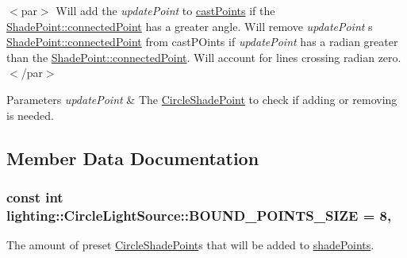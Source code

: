$<$par$>$ Will add the {\itshape update\+Point}  to \hyperlink{classlighting_1_1CircleLightSource_ab25c86954fad0715d502d1f60649ede4}{cast\+Points} if the \hyperlink{classlighting_1_1ShadePoint_a0840495febcd385a90e89e003aa15972}{Shade\+Point\+::connected\+Point} has a greater angle. Will remove {\itshape update\+Point} \textquotesingle{}s \hyperlink{classlighting_1_1ShadePoint_a0840495febcd385a90e89e003aa15972}{Shade\+Point\+::connected\+Point} from cast\+P\+Oints if {\itshape update\+Point}  has a radian greater than the \hyperlink{classlighting_1_1ShadePoint_a0840495febcd385a90e89e003aa15972}{Shade\+Point\+::connected\+Point}. Will account for lines crossing radian zero. $<$/par$>$ 
\begin{DoxyParams}{Parameters}
{\em update\+Point} & The \hyperlink{classlighting_1_1CircleShadePoint}{Circle\+Shade\+Point} to check if adding or removing is needed.\\
\hline
\end{DoxyParams}


\subsection{Member Data Documentation}
\subsubsection[{\texorpdfstring{B\+O\+U\+N\+D\+\_\+\+P\+O\+I\+N\+T\+S\+\_\+\+S\+I\+ZE}{BOUND_POINTS_SIZE}}]{\setlength{\rightskip}{0pt plus 5cm}const int lighting\+::\+Circle\+Light\+Source\+::\+B\+O\+U\+N\+D\+\_\+\+P\+O\+I\+N\+T\+S\+\_\+\+S\+I\+ZE = 8\hspace{0.3cm}{\ttfamily [static]}, {\ttfamily [protected]}}\hypertarget{classlighting_1_1CircleLightSource_a87ecfd274f02278cefe416a8c48133e8}{}\label{classlighting_1_1CircleLightSource_a87ecfd274f02278cefe416a8c48133e8}


The amount of preset \hyperlink{classlighting_1_1CircleShadePoint}{Circle\+Shade\+Point}s that will be added to \hyperlink{classlighting_1_1CircleLightSource_acdfea64be9d142f669338c5e206e753e}{shade\+Points}. 

